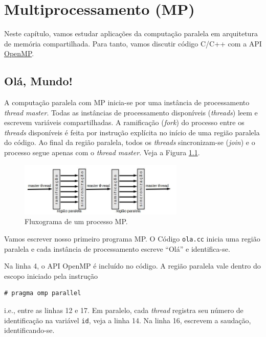 
\chapter{Multiprocessamento (MP)}\label{cap_mp}
\thispagestyle{fancy}

Neste capítulo, vamos estudar aplicações da computação paralela em arquitetura de memória compartilhada. Para tanto, vamos discutir código C/C++ com a API \href{https://www.openmp.org/}{OpenMP}.

\section{Olá, Mundo!}\label{sec_ola_cap_mp}

A computação paralela com MP inicia-se por uma instância de processamento \emph{thread master}. Todas as instâncias de processamento disponíveis (\emph{threads}) leem e escrevem variáveis compartilhadas. A ramificação ({\it fork}) do processo entre os {\it threads} disponíveis é feita por instrução explícita no início de uma região paralela do código. Ao final da região paralela, todos os {\it threads} sincronizam-se ({\it join}) e o processo segue apenas com o {\it thread master}. Veja a Figura \ref{fig:mpwf}.

\begin{figure}[H]
  \centering
  \includegraphics[width=0.7\textwidth]{./cap_mp/dados/fig_mpwf/mpwf}
  \caption{Fluxograma de um processo MP.}
  \label{fig:mpwf}
\end{figure}

Vamos escrever nosso primeiro programa MP. O Código \verb+ola.cc+ inicia uma região paralela e cada instância de processamento escreve ``Olá'' e identifica-se.



Na linha 4, o API OpenMP é incluído no código. A região paralela vale dentro do escopo iniciado pela instrução
\begin{verbatim}
# pragma omp parallel
\end{verbatim}
i.e., entre as linhas 12 e 17. Em paralelo, cada {\it thread} registra seu número de identificação na variável \verb+id+, veja a linha 14. Na linha 16, escrevem a saudação, identificando-se.

